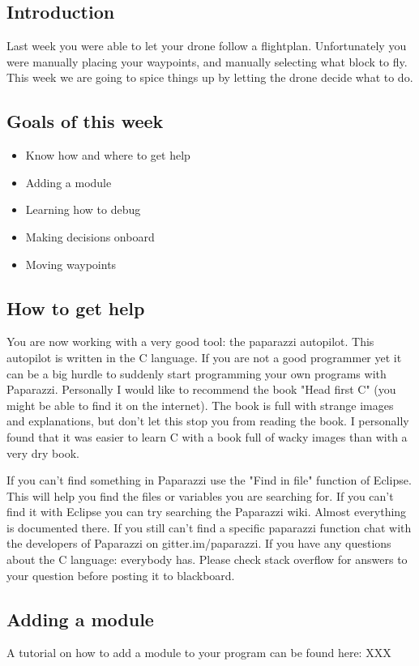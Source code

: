 \documentclass{article}
\begin{document}

\subsection*{Introduction}
Last week you were able to let your drone follow a flightplan. Unfortunately you were manually placing your waypoints, and manually selecting what block to fly. This week we are going to spice things up by letting the drone decide what to do. 

\subsection*{Goals of this week}
\begin{itemize}
\item Know how and where to get help
\item Adding a module
\item Learning how to debug
\item Making decisions onboard
\item Moving waypoints
\end{itemize}
\subsection*{How to get help}
You are now working with a very good tool: the paparazzi autopilot. This autopilot is written in the C language. If you are not a good programmer yet it can be a big hurdle to suddenly start programming your own programs with Paparazzi. Personally I would like to recommend the book "Head first C" (you might be able to find it on the internet). The book is full with strange images and explanations, but don't let this stop you from reading the book. I personally found that it was easier to learn C with a book full of wacky images than with a very dry book. 

If you can't find something in Paparazzi use the "Find in file" function of Eclipse. This will help you find the files or variables you are searching for.
If you can't find it with Eclipse you can try searching the Paparazzi wiki. Almost everything is documented there. 
If you still can't find a specific paparazzi function chat with the developers of Paparazzi on gitter.im/paparazzi.
If you have any questions about the C language: everybody has. Please check stack overflow for answers to your question before posting it to blackboard.

\subsection*{Adding a module}
A tutorial on how to add a module to your program can be found here: XXX
\end{document}
